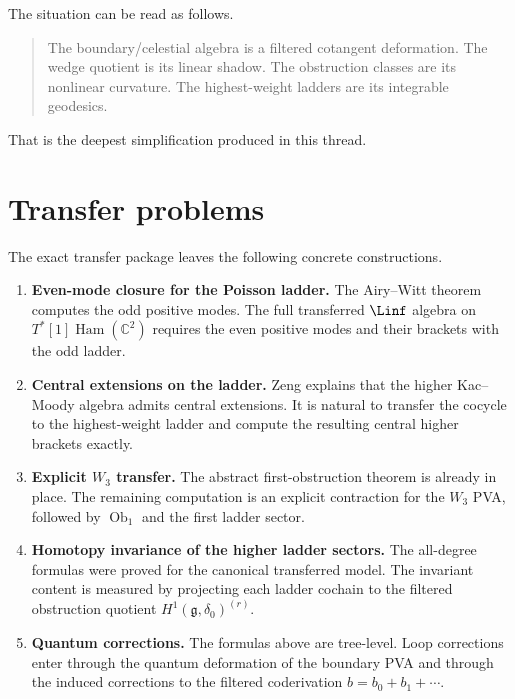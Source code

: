 The situation can be read as follows.

\begin{quote}
The boundary/celestial algebra is a filtered cotangent deformation. The wedge quotient is its linear shadow. The obstruction classes are its nonlinear curvature. The highest-weight ladders are its integrable geodesics.
\end{quote}

That is the deepest simplification produced in this thread.

\section{Transfer problems}

The exact transfer package leaves the following concrete constructions.

\begin{enumerate}[leftmargin=2.2em]
\item \textbf{Even-mode closure for the Poisson ladder.}
The Airy--Witt theorem computes the odd positive modes. The full
transferred $\Linf$ algebra on
$T^*[1]\operatorname{Ham}(\mathbb{C}^2)$ requires the even positive
modes and their brackets with the odd ladder.

\item \textbf{Central extensions on the ladder.}
Zeng explains that the higher Kac--Moody algebra admits central extensions. It is natural to transfer the cocycle to the highest-weight ladder and compute the resulting central higher brackets exactly.

\item \textbf{Explicit $W_3$ transfer.}
The abstract first-obstruction theorem is already in place. The
remaining computation is an explicit contraction for the $W_3$ PVA,
followed by $\operatorname{Ob}_1$ and the first ladder sector.

\item \textbf{Homotopy invariance of the higher ladder sectors.}
The all-degree formulas were proved for the canonical transferred
model. The invariant content is measured by projecting each ladder
cochain to the filtered obstruction quotient
$H^1(\mathfrak g,\delta_0)^{(r)}$.

\item \textbf{Quantum corrections.}
The formulas above are tree-level. Loop corrections enter through the
quantum deformation of the boundary PVA and through the induced
corrections to the filtered coderivation $b=b_0+b_1+\cdots$.
\end{enumerate}

